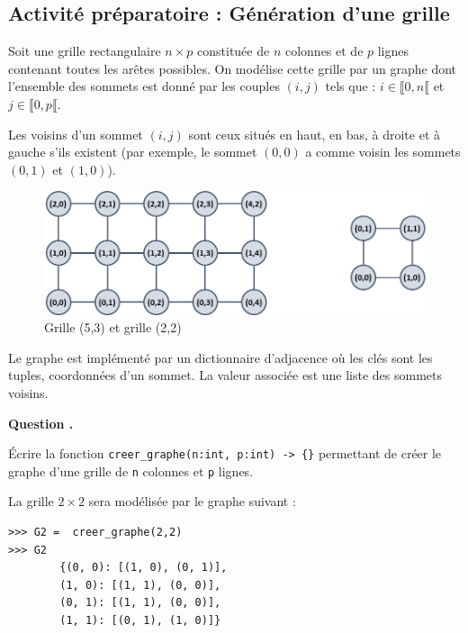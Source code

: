 \documentclass[t,11pt,eleve]{article}
\newcounter{cexo}
\newenvironment{qexo}{
\refstepcounter{cexo}
\vspace{3 pt}
\noindent
\begin{minipage}[t]{0.15\textwidth}
\textbf{\noindent Question \arabic{cexo}. }
\end{minipage}\noindent
\begin{minipage}[t]{0.85\textwidth}}{\vspace{3 pt}
\end{minipage}}%
\begin{document}
\entetetpinfo



\subsection*{Activité préparatoire : Génération d'une grille}

Soit une grille rectangulaire $n\times p$ constituée de $n$ colonnes et de $p$ lignes contenant toutes les arêtes possibles. On modélise cette grille par un graphe dont l'ensemble des sommets est donné par les couples $(i,j)$ tels que : $i\in\llbracket 0,n \llbracket $ et $j\in\llbracket 0,p \llbracket $.

Les voisins d'un sommet $(i,j)$ sont ceux situés en haut, en bas, à droite et à gauche s'ils existent (par exemple, le sommet $(0,0)$ a comme voisin les sommets $(0,1)$ et $(1,0)$).



\begin{figure}[!h]\centering
\includegraphics[width=12cm]{fig_01}
\caption{Grille (5,3) et grille (2,2)}
\end{figure}

Le graphe est implémenté par un dictionnaire d'adjacence où les clés sont les tuples, coordonnées d'un sommet. La valeur associée est une liste des sommets voisins. 


\begin{qexo}
Écrire la fonction \texttt{creer\_graphe(n:int, p:int) -> \{\}} permettant de créer le graphe d'une grille de \texttt{n} colonnes et \texttt{p} lignes.
\end{qexo}

\begin{exemple}
La grille $ 2 \times 2$ sera modélisée par le graphe suivant :

\begin{lstlisting}
>>> G2 =  creer_graphe(2,2)
>>> G2
        {(0, 0): [(1, 0), (0, 1)],
        (1, 0): [(1, 1), (0, 0)],
        (0, 1): [(1, 1), (0, 0)],
        (1, 1): [(0, 1), (1, 0)]}
\end{lstlisting}
\end{exemple}
\end{document}
